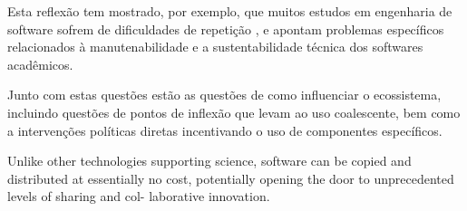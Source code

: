 Esta
reflexão tem mostrado, por exemplo, que muitos estudos em engenharia de
software sofrem de dificuldades de repetição \cite{Tang2016}, e apontam
problemas específicos relacionados à manutenabilidade e a sustentabilidade
técnica dos softwares acadêmicos.

Junto com estas questões estão as questões de como influenciar o ecossistema,
incluindo questões de pontos de inflexão que levam ao uso coalescente, bem como
a intervenções políticas diretas incentivando o uso de componentes específicos.

Unlike other technologies supporting science, software can
be copied and distributed at essentially no cost, potentially
opening the door to unprecedented levels of sharing and col-
laborative innovation. \cite{howison2011scientific}




